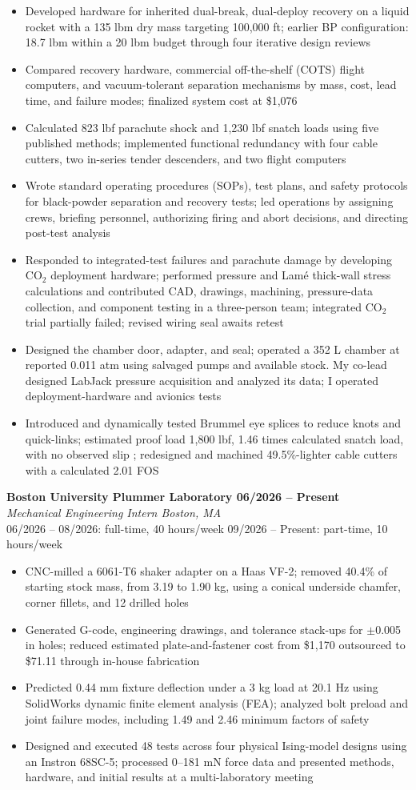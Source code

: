 \documentclass[letterpaper,11pt]{article}
\newcommand{\resumeEntry}[4]{
  {\small\textbf{#1 \textbar{} #2}}\\[-1pt]
  {\small\textit{#3}}\\[-1pt]
  {\small #4}
}
\newcommand{\resumeItem}[1]{\item \small{#1}}
\newcommand{\resumeItemListStart}{
  \begin{itemize}[
    leftmargin=0.17in,
    label=\textbullet,
    itemsep=1.5pt,
    topsep=2pt,
    parsep=0pt,
    partopsep=0pt
  ]
}
\newcommand{\resumeItemListEnd}{
  \end{itemize}\vspace{3pt}
}
\begin{document}
\resumeItemListStart
  \resumeItem{
    Developed hardware for inherited dual-break, dual-deploy recovery on a
    liquid rocket with a 135 lbm dry mass targeting 100,000 ft;
    earlier BP configuration: 18.7 lbm within a 20 lbm budget through
    four iterative design reviews
  }
  \resumeItem{
    Compared recovery hardware, commercial off-the-shelf (COTS)
    flight computers, and vacuum-tolerant separation mechanisms
    by mass, cost, lead time, and failure modes; finalized system cost
    at \$1,076
  }
  \resumeItem{
    Calculated 823 lbf parachute shock and 1,230 lbf snatch loads
    using five published methods; implemented functional
    redundancy with four cable cutters, two in-series tender
    descenders, and two flight computers
  }
  \resumeItem{
    Wrote standard operating procedures (SOPs), test plans, and safety
    protocols for black-powder separation and recovery tests; led operations by assigning crews, briefing personnel,
    authorizing firing and abort decisions, and directing post-test analysis
  }
  \resumeItem{
    Responded to integrated-test failures and parachute damage by
    developing CO$_2$ deployment hardware;
    performed pressure and Lam\'{e} thick-wall stress calculations and
    contributed CAD, drawings, machining, pressure-data collection,
    and component testing in a three-person team; integrated CO$_2$ trial partially failed; revised wiring seal awaits retest
  }
  \resumeItem{
    Designed the chamber door, adapter, and seal; operated a 352 L
    chamber at reported 0.011 atm using salvaged pumps and available stock.
    My co-lead designed LabJack pressure acquisition and analyzed its data;
    I operated deployment-hardware and avionics tests
  }
  \resumeItem{
    Introduced and dynamically tested Brummel eye splices to reduce
    knots and quick-links; estimated proof load 1,800 lbf, 1.46 times calculated snatch load, with no observed slip
    ; redesigned and machined 49.5\%-lighter cable cutters with a
    calculated 2.01 FOS
  }
\resumeItemListEnd

\resumeEntry
  {Boston University Plummer Laboratory}
  {06/2026 -- Present}
  {Mechanical Engineering Intern \textbar{} Boston, MA}
  {06/2026 -- 08/2026: full-time, 40 hours/week
   \textbar{} 09/2026 -- Present: part-time, 10 hours/week}

\resumeItemListStart
  \resumeItem{
    CNC-milled a 6061-T6 shaker adapter on a Haas VF-2; removed
    40.4\% of starting stock mass, from 3.19 to 1.90 kg, using a conical
    underside chamfer, corner fillets, and 12 drilled holes
  }
  \resumeItem{
    Generated G-code, engineering drawings, and tolerance stack-ups
    for $\pm$0.005 in holes; reduced estimated plate-and-fastener cost
    from \$1,170 outsourced to \$71.11 through in-house fabrication
  }
  \resumeItem{
    Predicted 0.44 mm fixture deflection under a 3 kg load at
    20.1 Hz using SolidWorks dynamic finite element analysis (FEA);
    analyzed bolt preload and joint failure modes, including 1.49 and
    2.46 minimum factors of safety
  }
  \resumeItem{
    Designed and executed 48 tests across four physical Ising-model
    designs using an Instron 68SC-5; processed 0--181 mN force data
    and presented methods, hardware, and initial results at a
    multi-laboratory meeting
  }
\resumeItemListEnd
\end{document}
